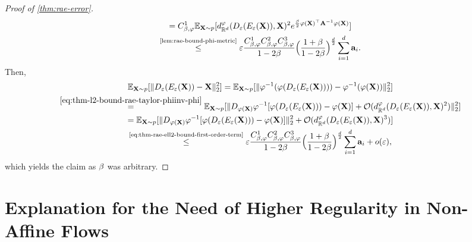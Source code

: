 \begin{proof}[Proof of \ref{thm:rae-error}]
\begin{multline}
        = C^1_{\beta,\varphi} \mathbb{E}_{\mathbf{X} \sim p}[ d_{\mathbb{R}^{d}}^\varphi (D_\varepsilon(E_\varepsilon(\mathbf{X})), \mathbf{X})^2 e^{\frac{\beta}{2} \varphi(\mathbf{X})^\top \mathbf{A}^{-1} \varphi(\mathbf{X})}]\\
        \overset{\text{\ref{lem:rae-bound-phi-metric}}}{\leq} \varepsilon  \frac{C^1_{\beta,\varphi} C^2_{\beta,\varphi} C^3_{\beta,\varphi}}{1 - 2\beta} \Bigl(\frac{1 + \beta}{1 - 2\beta} \Bigr)^{\frac{d}{2}}  \sum_{i=1}^{d} \mathbf{a}_{i}.
        \label{eq:thm-rae-ell2-bound-first-order-term}
    \end{multline}
    Then, 
    \begin{multline}
        \mathbb{E}_{\mathbf{X} \sim p}[\| D_\varepsilon(E_\varepsilon(\mathbf{X}))-  \mathbf{X}\|_2^2] = \mathbb{E}_{\mathbf{X} \sim p}[\| \varphi^{-1}(\varphi( D_\varepsilon(E_\varepsilon(\mathbf{X})) ))-  \varphi^{-1}(\varphi(\mathbf{X}))\|_2^2] \\
        \overset{\ref{eq:thm-l2-bound-rae-taylor-phiinv-phi}}{=} \mathbb{E}_{\mathbf{X} \sim p}[\|D_{\varphi(\mathbf{X})} \varphi^{-1} [\varphi(D_\varepsilon(E_\varepsilon(\mathbf{X}))) - \varphi(\mathbf{X})]  + \mathcal{O}(d_{\mathbb{R}^{d}}^\varphi(D_\varepsilon(E_\varepsilon(\mathbf{X})),\mathbf{X})^2)\|_2^2] \\
        = \mathbb{E}_{\mathbf{X} \sim p}[\|D_{\varphi(\mathbf{X})} \varphi^{-1} [\varphi(D_\varepsilon(E_\varepsilon(\mathbf{X}))) - \varphi(\mathbf{X})]\|_2^2 + \mathcal{O}(d_{\mathbb{R}^{d}}^\varphi(D_\varepsilon(E_\varepsilon(\mathbf{X})),\mathbf{X})^3)]\\
        \overset{\text{\ref{eq:thm-rae-ell2-bound-first-order-term}}}{\leq} \varepsilon  \frac{C^1_{\beta,\varphi} C^2_{\beta,\varphi} C^3_{\beta,\varphi}}{1 - 2\beta} \Bigl(\frac{1 + \beta}{1 - 2\beta} \Bigr)^{\frac{d}{2}}  \sum_{i=1}^{d} \mathbf{a}_{i} + o(\varepsilon),
    \end{multline}
    which yields the claim as $\beta$ was arbitrary. 
\end{proof}

\section{Explanation for the Need of Higher Regularity in Non-Affine Flows}
\label{app:expanded_loss_function}

